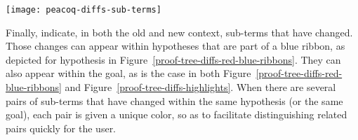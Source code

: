 \begin{figure*}[!htp]
\texttt{[image: peacoq-diffs-sub-terms]}{\parfillskip=0pt\par}
\caption{Proof-tree visual diff between two obligation nodes (sub-term highlights)}%
\label{proof-tree-diffs-highlights}
\end{figure*}

Finally,  indicate, in both the old and new
context, sub-terms that have changed.  Those changes can appear within
hypotheses that are part of a blue ribbon, as depicted for hypothesis
 in Figure~\ref{proof-tree-diffs-red-blue-ribbons}.  They can also
appear within the goal, as is the case in both
Figure~\ref{proof-tree-diffs-red-blue-ribbons} and
Figure~\ref{proof-tree-diffs-highlights}.  When there are several pairs of
sub-terms that have changed within the same hypothesis (or the same goal), each
pair is given a unique color, so as to facilitate distinguishing related pairs
quickly for the user.
